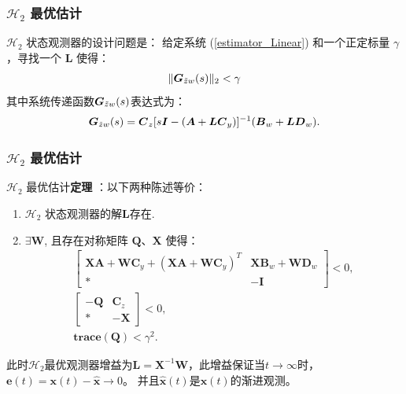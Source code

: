 \documentclass{beamer}
\newcommand{\vo}[1]{\boldsymbol{#1}}
\begin{document}
\begin{frame}
	\frametitle{$\mathcal{H}_2$ 最优估计}
	$\mathcal{H}_2$ 状态观测器的设计问题是： 给定系统 (\ref{estimator_Linear}) 和一个正定标量 $\gamma$，寻找一个 $\vo{L}$ 使得：
	\begin{align}\label{min1}
		\|\vo{G}_{\Tilde{z}w}(s)\|_{2} < \gamma
	\end{align}
其中系统传递函数$\vo{G}_{\Tilde{z}w}(s)$表达式为：
\begin{align}\label{errorTF}
	\vo{G}_{\Tilde{z} w}(s) = \vo{C}_z [s \vo{I} -( \vo{A} + \vo{L} \vo{C}_y)]^{-1} (\vo{B}_w + \vo{L} \vo{D}_w) .
\end{align}
\end{frame}

\begin{frame}
	\frametitle{$\mathcal{H}_2$ 最优估计}
	$\mathcal{H}_2$ 最优估计\textbf{定理 } \cite{duan2013lmis, apkarian2001continuous} ：以下两种陈述等价：
	\begin{enumerate}
		\item $\mathcal{H}_2$ 状态观测器的解$\vo{L}$存在.
		\item $\exists \vo{W}$, 且存在对称矩阵 $\vo{Q}$、$\vo{X}$ 使得：
		       \begin{align}\label{CT_LMI}
			\begin{bmatrix}\nonumber
				\vo{XA}+\vo{W} \vo{C}_y +(\vo{XA}+\vo{W} \vo{C}_y)^T &  \vo{X} \vo{B}_w+\vo{W} \vo{D}_w\\
				\vo{*}      & -\vo{I}
			\end{bmatrix}
			< 0,\\
			\begin{bmatrix}\nonumber
				\vo{-Q}  &  \vo{C}_z\\
				\vo{*} & \vo{-X}
			\end{bmatrix}
			< 0,\\
			\textbf{trace}(\vo{Q}) < \gamma^2.
		\end{align}
	\end{enumerate}
此时$\mathcal{H}_2$最优观测器增益为$\vo{L} = \vo{X}^{-1} \vo{W}$，此增益保证当$t \rightarrow \infty $时，$ \vo{e}(t) = \vo{x}(t) - \hat{\vo{x}} \rightarrow 0 $。
并且$\hat{\vo{x}}(t)$是$\vo{x}(t)$的渐进观测。
\end{frame}
\end{document}
